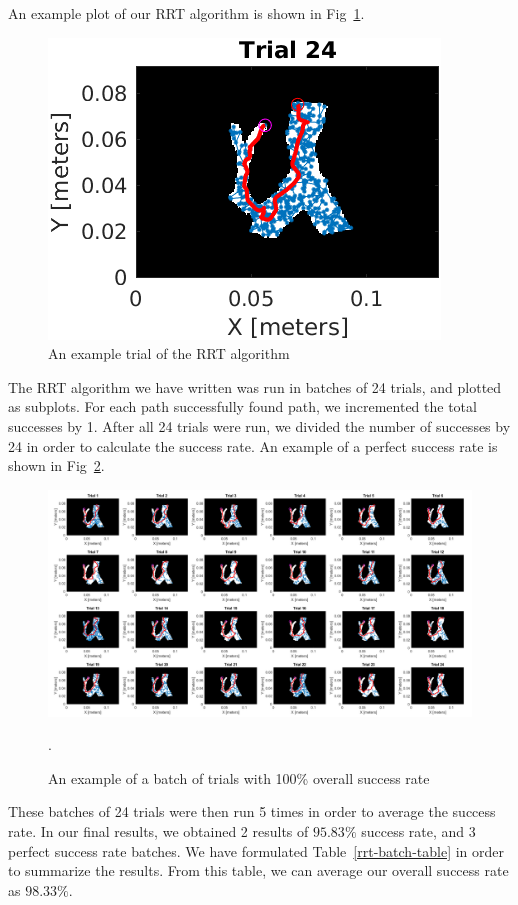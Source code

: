 \documentclass[conference]{IEEEtran}
\begin{document}
An example plot of our RRT algorithm is shown in Fig~\ref{trial24-fig}.

\begin{figure}[h]
    \centering
    \includegraphics[scale=0.85]{trial24.png}
    \caption{An example trial of the RRT algorithm}
    \label{trial24-fig}
\end{figure}

The RRT algorithm we have written was run in batches of 24 trials, and plotted as subplots.
For each path successfully found path, we incremented the total successes by 1. After all
24 trials were run, we divided the number of successes by 24 in order to calculate the
success rate. An example of a perfect success rate is shown in Fig~\ref{trial-batch-img}.

\begin{figure}[h]
    \centering
    \includegraphics[scale=0.21]{random-trials.png}
    \caption{An example of a batch of trials with 100\% overall success rate}
    \label{trial-batch-img}.
\end{figure}

These batches of 24 trials were then run 5 times in order to average the success rate. In
our final results, we obtained 2 results of $95.83\%$ success rate, and 3 perfect success
rate batches. We have formulated Table~\ref{rrt-batch-table} in order to summarize the results.
From this table, we can average our overall success rate as $98.33\%$.
\end{document}
